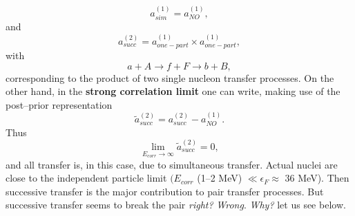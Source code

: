 %



\begin{equation}
a_{sim}^{(1)}=a_{NO}^{(1)},
\end{equation}
and
\begin{equation}
a_{succ}^{(2)}=a_{one-part}^{(1)}\times a_{one-part}^{(1)},
\end{equation}
\vspace{0.2cm}
with
\begin{equation}
a+A\rightarrow f+F \rightarrow b+B,
\end{equation}         
corresponding to the product of two single nucleon transfer processes.
On the other hand, in the \textbf{strong correlation limit} one can write, making use of the
post--prior representation
\begin{equation}
\tilde a_{succ}^{(2)}= a_{succ}^{(2)}-a_{NO}^{(1)}.
\end{equation}
Thus
\begin{equation}
\lim_{E_{corr}\rightarrow \infty} \tilde a_{succ}^{(2)}=0,
\end{equation}
and all transfer is, in this case, due to simultaneous transfer.
Actual nuclei are close to the independent particle limit $(E_{corr}$ (1--2 MeV) $\ll \epsilon_F\approx$ 36 MeV). Then successive transfer is the major contribution to pair transfer processes. But successive transfer seems to break the pair \textit{right?} \textit{Wrong}. \textit{Why?} let us see below.
